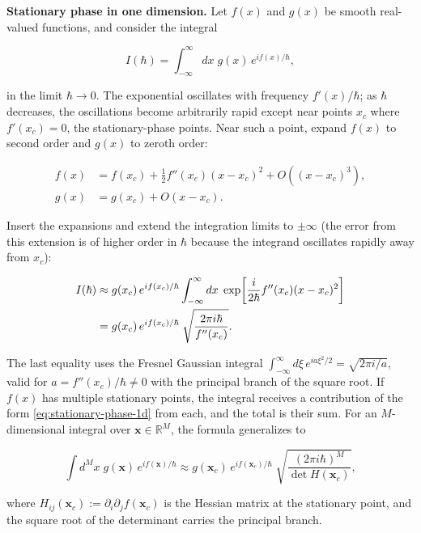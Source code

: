 \medskip\noindent\textbf{Stationary phase in one dimension.}
Let $f(x)$ and $g(x)$ be smooth real-valued functions, and consider the integral
\begin{linenomath}
\begin{equation}
I(\hbar) = \int_{-\infty}^{\infty} dx\; g(x)\, e^{i f(x)/\hbar},
\end{equation}
\end{linenomath}
in the limit $\hbar \to 0$. The exponential oscillates with frequency $f'(x)/\hbar$; as $\hbar$ decreases, the oscillations become arbitrarily rapid except near points $x_c$ where $f'(x_c) = 0$, the stationary-phase points. Near such a point, expand $f(x)$ to second order and $g(x)$ to zeroth order:
\begin{linenomath}
\begin{align}
f(x) &= f(x_c) + \frac{1}{2} f''(x_c)(x - x_c)^2 + O((x-x_c)^3), \\
g(x) &= g(x_c) + O(x-x_c).
\end{align}
\end{linenomath}
Insert the expansions and extend the integration limits to $\pm\infty$ (the error from this extension is of higher order in $\hbar$ because the integrand oscillates rapidly away from $x_c$):
\begin{linenomath}
\begin{align}
I(\hbar) &\approx g(x_c)\, e^{i f(x_c)/\hbar} \int_{-\infty}^{\infty} dx\; \exp\!\left[\frac{i}{2\hbar} f''(x_c)(x-x_c)^2\right] \notag\\
&= g(x_c)\, e^{i f(x_c)/\hbar}\; \sqrt{\frac{2\pi i\hbar}{f''(x_c)}}.
\label{eq:stationary-phase-1d}
\end{align}
\end{linenomath}
The last equality uses the Fresnel Gaussian integral $\int_{-\infty}^{\infty} d\xi\, e^{i a \xi^2/2} = \sqrt{2\pi i / a}$, valid for $a = f''(x_c)/\hbar \neq 0$ with the principal branch of the square root. If $f(x)$ has multiple stationary points, the integral receives a contribution of the form \eqref{eq:stationary-phase-1d} from each, and the total is their sum. For an $M$-dimensional integral over $\bm x \in \mathbb{R}^M$, the formula generalizes to
\begin{linenomath}
\begin{equation}
\int d^M x\; g(\bm x)\, e^{i f(\bm x)/\hbar} \approx g(\bm x_c)\, e^{i f(\bm x_c)/\hbar}\;
\sqrt{\frac{(2\pi i\hbar)^M}{\det H(\bm x_c)}},
\end{equation}
\end{linenomath}
where $H_{ij}(\bm x_c) := \partial_i\partial_j f(\bm x_c)$ is the Hessian matrix at the stationary point, and the square root of the determinant carries the principal branch.

